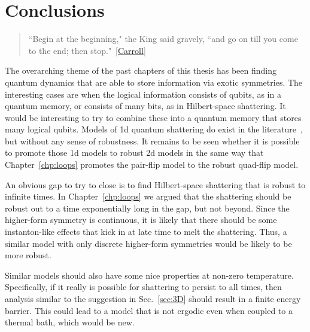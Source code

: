 
\chapter{Conclusions}
\label{chp:conclusion}

\begin{quotation}
	 ``Begin at the beginning," the King said gravely, ``and go on till you come to the end; then stop."~[\hyperlink{cite.\therefsection @Carroll2002Alice}{Carroll}]
\end{quotation}

The overarching theme of the past chapters of this thesis has been finding quantum dynamics that are able to store information via exotic symmetries. The interesting cases are when the logical information consists of qubits, as in a quantum memory, or consists of many bits, as in Hilbert-space shattering. It would be interesting to try to combine these into a quantum memory that stores many logical qubits. Models of 1d quantum shattering do exist in the literature~\cite{Moudgalya2022Commutant}, but without any sense of robustness. It remains to be seen whether it is possible to promote those 1d models to robust 2d models in the same way that Chapter~\ref{chp:loops} promotes the pair-flip model to the robust quad-flip model.

An obvious gap to try to close is to find Hilbert-space shattering that is robust to infinite times. In Chapter~\ref{chp:loops} we argued that the shattering should be robust out to a time exponentially long in the gap, but not beyond. Since the higher-form symmetry is continuous, it is likely that there should be some instanton-like effects that kick in at late time to melt the shattering. Thus, a similar model with only discrete higher-form symmetries would be likely to be more robust.

Similar models should also have some nice properties at non-zero temperature. Specifically, if it really is possible for shattering to persist to all times, then analysis similar to the suggestion in Sec.~\ref{sec:3D} should result in a finite energy barrier. This could lead to a model that is not ergodic even when coupled to a thermal bath, which would be new.

